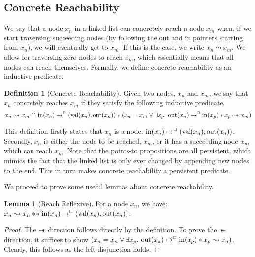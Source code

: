 \documentclass[a4paper, 10pt]{report}
\theoremstyle{definition}
\newtheorem{lemma}[theorem]{Lemma}
\newtheorem{definition}{Definition}[section]
\newcommand{\nIn}[1]{\operatorname{in}(#1)}
\newcommand{\nVal}[1]{\operatorname{val}(#1)}
\newcommand{\nOut}[1]{\operatorname{out}(#1)}
\newcommand{\node}{x}
\newcommand{\nodeM}[1]{\node_{#1}}
\newcommand{\isNode}[1]{\nIn{#1} \mapsto^{\persistently} (\nVal{#1}, \nOut{#1})}
\newcommand{\reach}[2]{#1 \leadsto #2}
\begin{document}
\subsection{Concrete Reachability}
We say that a node $\nodeM{n}$ in a linked list can concretely reach a node $\nodeM{m}$ when, if we start traversing succeeding nodes (by following the out and in pointers starting from $\nodeM{n}$), we will eventually get to $\nodeM{m}$. If this is the case, we write $\reach{\nodeM{n}}{\nodeM{m}}$. We allow for traversing zero nodes to reach $\nodeM{m}$, which essentially means that all nodes can reach themselves. Formally, we define concrete reachability as an inductive predicate.
\begin{definition}[Concrete Reachability]
  Given two nodes, $\nodeM{n}$ and $\nodeM{m}$, we say that $\nodeM{n}$ concretely reaches $\nodeM{m}$ if they satisfy the following inductive predicate.
  \begin{equation*}
    \reach{\nodeM{n}}{\nodeM{m}} \eqdef \isNode{\nodeM{n}} \star{} (\nodeM{n} = \nodeM{m} \lor{} \Exists \nodeM{p} . \nOut{\nodeM{n}} \mapsto^{\persistently} \nIn{\nodeM{p}} \star{} \reach{\nodeM{p}}{\nodeM{m}})
  \end{equation*}
\end{definition}
This definition firstly states that $\nodeM{n}$ is a node: $\isNode{\nodeM{n}}$. Secondly, $\nodeM{n}$ is either the node to be reached, $\nodeM{m}$, or it has a succeeding node $\nodeM{p}$, which can reach $\nodeM{m}$.
Note that the points-to propositions are all persistent, which mimics the fact that the linked list is only ever changed by appending new nodes to the end. This in turn makes concrete reachability a persistent predicate.

We proceed to prove some useful lemmas about concrete reachability.
\begin{lemma}[Reach Reflexive]\label{lemma:reach-reflexive}
  For a node $\nodeM{n}$, we have: $\reach{\nodeM{n}}{\nodeM{n}} \wandIff \isNode{\nodeM{n}}$.
\end{lemma}
\begin{proof}
  The $\mathrel{-\!\!*}$ direction follows directly by the definition. To prove the $\mathrel{*\!\!-}$ direction, it suffices to show $(\nodeM{n} = \nodeM{n} \lor{} \Exists \nodeM{p} . \nOut{\nodeM{n}} \mapsto^{\persistently} \nIn{\nodeM{p}} \star{} \reach{\nodeM{p}}{\nodeM{n}})$. Clearly, this follows as the left disjunction holds.
\end{proof}
\end{document}
